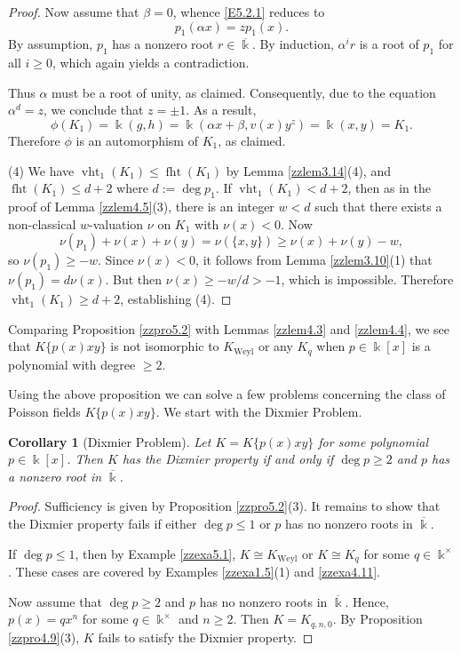 \documentclass[12pt]{amsart}
\theoremstyle{plain}
\newtheorem{corollary}[theorem]{Corollary}
\numberwithin{theorem}{section}
\numberwithin{equation}{theorem}
\theoremstyle{definition}
\DeclareMathOperator{\fht}{fht}
\DeclareMathOperator{\vht}{vht}
\DeclareMathOperator{\Weyl}{Weyl}
\newcommand \Kweyl {K_{\Weyl}}
\newcommand \kx {\Bbbk^\times}
\begin{document}
\begin{proof}
Now assume that $\beta = 0$, whence \eqref{E5.2.1} reduces to
$$p_1(\alpha x) = z p_1(x).$$
By assumption, $p_1$ has a nonzero root 
$r \in \overline{\Bbbk}$. By induction, $\alpha^i r$ is a root of 
$p_1$ for all $i \ge 0$, which again yields a contradiction.

Thus $\alpha$ must be a root of unity, as claimed. Consequently, 
due to the equation $\alpha^d = z$, we conclude that $z = \pm 1$. 
As a result,
$$\phi(K_1) = \Bbbk(g,h) = \Bbbk(\alpha x + \beta, v(x) y^z) 
= \Bbbk(x,y) = K_1.$$
Therefore $\phi$ is an automorphism of $K_1$, as claimed.

(4) We have $\vht_1(K_1) \le \fht(K_1)$ by Lemma \ref{zzlem3.14}(4), and $\fht(K_1) \le d+2$ where $d := \deg p_1$.  If $\vht_1(K_1) < d+2$, then as in the proof of Lemma \ref{zzlem4.5}(3), there is an integer $w < d$ such that there exists a non-classical $w$-valuation $\nu$ on $K_1$ with $\nu(x) < 0$.  Now
$$
\nu(p_1) + \nu(x) + \nu(y) = \nu(\{x,y\}) \ge \nu(x) + \nu(y) - w,
$$
so $\nu(p_1) \ge - w$.  Since $\nu(x) < 0$, it follows from Lemma \ref{zzlem3.10}(1) that $\nu(p_1) = d \nu(x)$.  But then $\nu(x) \ge - w/d > -1$, which is impossible.  Therefore $\vht_1(K_1) \ge d+2$, establishing (4).
\end{proof}

Comparing Proposition \ref{zzpro5.2} with Lemmas \ref{zzlem4.3} and \ref{zzlem4.4}, we see that $K\{p(x)xy\}$ is not isomorphic to $\Kweyl$ or any $K_q$ when $p \in \Bbbk[x]$ is a polynomial with degree $\ge2$.

Using the above proposition we can solve a few 
problems concerning the class of Poisson fields $K\{p(x) xy\}$.
We start with the Dixmier Problem.

\begin{corollary}[Dixmier Problem]
\label{zzcor5.3}
Let $K = K\{p(x)xy\}$ for some polynomial $p \in \Bbbk[x]$. 
Then $K$ has the Dixmier property if and only if $\deg p \ge 2$ 
and $p$ has a nonzero root in $\overline{\Bbbk}$.
\end{corollary}

\begin{proof}
Sufficiency is given by Proposition \ref{zzpro5.2}(3). It 
remains to show that the Dixmier property fails if either 
$\deg p \le 1$ or $p$ has no nonzero roots in $\overline{\Bbbk}$.

If $\deg p \le 1$, then by Example \ref{zzexa5.1}, 
$K \cong K_{\Weyl}$ or $K \cong K_q$ for some $q \in \kx$. 
These cases are 
covered by Examples \ref{zzexa1.5}(1) and \ref{zzexa4.11}.

Now assume that $\deg p \ge 2$ and $p$ has no nonzero 
roots in $\overline{\Bbbk}$. Hence, $p(x) = q x^n$ for 
some $q \in \kx$ and $n \ge 2$. Then $K = K_{q,n,0}$. By Proposition \ref{zzpro4.9}(3), $K$ fails to 
satisfy the Dixmier property.
\end{proof}
\end{document}
